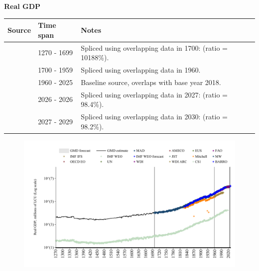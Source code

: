 \documentclass[12pt,a4paper,landscape]{article}
\begin{document}
\begin{adjustbox}{max totalsize={\paperwidth}{\paperheight},center}
\begin{minipage}[t][\textheight][t]{\textwidth}
\vspace*{0.5cm}
{}
\begin{center}
{\Large\bfseries Real GDP}
\end{center}
\vspace{0.5cm}
\begin{table}[H]
\centering
\small
\begin{tabular}{|l|l|l|}
\hline
\textbf{Source} & \textbf{Time span} & \textbf{Notes} \\
\hline
\rowcolor{white}\cite{CS1_GBR}& 1270 - 1699 &Spliced using overlapping data in 1700: (ratio = 10188\%). \\
\rowcolor{lightgray}\cite{MW}& 1700 - 1959 &Spliced using overlapping data in 1960. \\
\rowcolor{white}\cite{OECD_EO}& 1960 - 2025 &Baseline source, overlaps with base year 2018. \\
\rowcolor{lightgray}\cite{AMECO}& 2026 - 2026 &Spliced using overlapping data in 2027: (ratio = 98.4\%). \\
\rowcolor{white}\cite{IMF_WEO_forecast}& 2027 - 2029 &Spliced using overlapping data in 2030: (ratio = 98.2\%). \\
\hline
\end{tabular}
\end{table}
\begin{figure}[H]
\centering
\includegraphics[width=\textwidth,height=0.6\textheight,keepaspectratio]{graphs/GBR_rGDP.pdf}
\end{figure}
\end{minipage}
\end{adjustbox}
\end{document}
